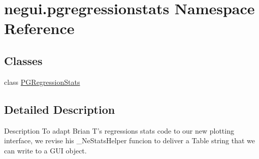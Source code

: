 \hypertarget{namespacenegui_1_1pgregressionstats}{}\section{negui.\+pgregressionstats Namespace Reference}
\label{namespacenegui_1_1pgregressionstats}
\subsection*{Classes}
\begin{DoxyCompactItemize}
\item 
class \hyperlink{classnegui_1_1pgregressionstats_1_1PGRegressionStats}{P\+G\+Regression\+Stats}
\end{DoxyCompactItemize}


\subsection{Detailed Description}
\begin{DoxyVerb}Description
To adapt Brian T's regressions stats code
to our new plotting interface, we revise
his _NeStatsHelper funcion to deliver a Table
string that we can write to a GUI object.
\end{DoxyVerb}
 